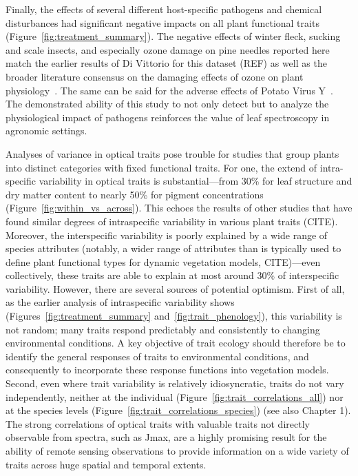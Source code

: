 Finally, the effects of several different host-specific pathogens and chemical disturbances had significant negative impacts on all plant functional traits (Figure~\ref{fig:treatment_summary}).
The negative effects of winter fleck, sucking and scale insects, and especially ozone damage on pine needles reported here match the earlier results of Di Vittorio for this dataset (REF) as well as the broader literature consensus on the damaging effects of ozone on plant physiology~\cite{lindroth_2010_impacts}.
The same can be said for the adverse effects of Potato Virus Y~\cite{scholthof_2011_top10}.
The demonstrated ability of this study to not only detect but to analyze the physiological impact of pathogens reinforces the value of leaf spectroscopy in agronomic settings.


Analyses of variance in optical traits pose trouble for studies that group plants into distinct categories with fixed functional traits.
For one, the extend of intra-specific variability in optical traits is substantial---from 30\% for leaf structure and dry matter content to nearly 50\% for pigment concentrations (Figure~\ref{fig:within_vs_across}).
This echoes the results of other studies that have found similar degrees of intraspecific variability in various plant traits (CITE).
Moreover, the interspecific variability is poorly explained by a wide range of species attributes (notably, a wider range of attributes than is typically used to define plant functional types for dynamic vegetation models, CITE)---even collectively, these traits are able to explain at most around 30\% of interspecific variability.
However, there are several sources of potential optimism.
First of all, as the earlier analysis of intraspecific variability shows (Figures~\ref{fig:treatment_summary} and~\ref{fig:trait_phenology}), this variability is not random; many traits respond predictably and consistently to changing environmental conditions.
A key objective of trait ecology should therefore be to identify the general responses of traits to environmental conditions, and consequently to incorporate these response functions into vegetation models.
Second, even where trait variability is relatively idiosyncratic, traits do not vary independently, neither at the individual (Figure~\ref{fig:trait_correlations_all}) nor at the species levels (Figure~\ref{fig:trait_correlations_species}) (see also Chapter 1).
The strong correlations of optical traits with valuable traits not directly observable from spectra, such as Jmax, are a highly promising result for the ability of remote sensing observations to provide information on a wide variety of traits across huge spatial and temporal extents.
